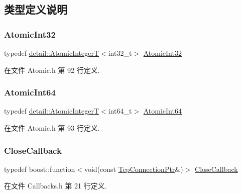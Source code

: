 \subsection{类型定义说明}
\mbox{\label{namespacemuduo_a5ff4a046f03836ad4fb080652d419987}} 
\subsubsection{\texorpdfstring{Atomic\+Int32}{AtomicInt32}}
{\footnotesize\ttfamily typedef \hyperlink{classmuduo_1_1detail_1_1AtomicIntegerT}{detail\+::\+Atomic\+IntegerT}$<$int32\+\_\+t$>$ \hyperlink{namespacemuduo_a5ff4a046f03836ad4fb080652d419987}{Atomic\+Int32}}



在文件 Atomic.\+h 第 92 行定义.

\mbox{\label{namespacemuduo_aa79d31350742dfc80edb0d9a5df0e7e7}} 
\subsubsection{\texorpdfstring{Atomic\+Int64}{AtomicInt64}}
{\footnotesize\ttfamily typedef \hyperlink{classmuduo_1_1detail_1_1AtomicIntegerT}{detail\+::\+Atomic\+IntegerT}$<$int64\+\_\+t$>$ \hyperlink{namespacemuduo_aa79d31350742dfc80edb0d9a5df0e7e7}{Atomic\+Int64}}



在文件 Atomic.\+h 第 93 行定义.

\mbox{\label{namespacemuduo_ab2469aa3fe08794ee43a3d8f69bff30f}} 
\subsubsection{\texorpdfstring{Close\+Callback}{CloseCallback}}
{\footnotesize\ttfamily typedef boost\+::function$<$void(const \hyperlink{namespacemuduo_a40c45128e9700d337d92f3cbb8dd4a0a}{Tcp\+Connection\+Ptr}\&)$>$ \hyperlink{namespacemuduo_ab2469aa3fe08794ee43a3d8f69bff30f}{Close\+Callback}}



在文件 Callbacks.\+h 第 21 行定义.

